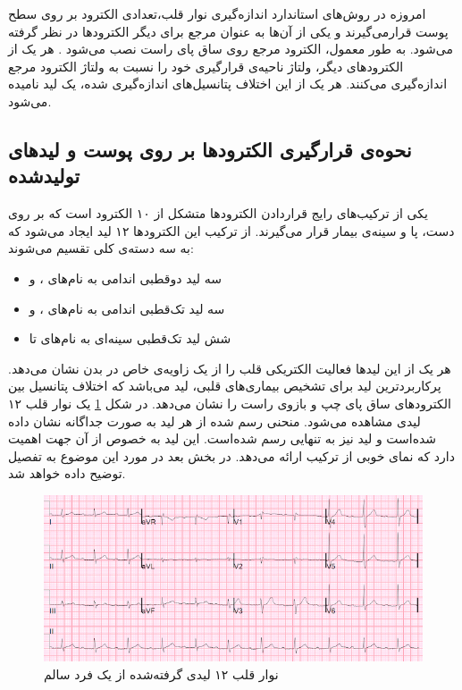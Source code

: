 امروزه در روش‌های استاندارد اندازه‌گیری نوار قلب،تعدادی الکترود بر روی سطح پوست قرارمی‌گیرند و یکی از آن‌ها به عنوان مرجع برای دیگر الکترودها در نظر گرفته می‌شود. به طور معمول، الکترود مرجع روی ساق پای راست نصب می‌شود \cite{ECGSurvey}. هر یک از الکترودهای دیگر، ولتاژ ناحیه‌ی قرارگیری خود را نسبت به ولتاژ الکترود مرجع اندازه‌گیری می‌کنند. هر یک از این اختلاف پتانسیل‌های اندازه‌گیری شده، یک لید نامیده می‌شود. 
\subsection{نحوه‌ی قرارگیری الکترودها بر روی پوست و لیدهای تولیدشده}

یکی از ترکیب‌های رایج قراردادن الکترودها متشکل از ۱۰ الکترود است که بر روی دست، پا و سینه‌ی بیمار قرار می‌گیرند. از ترکیب این الکترودها ۱۲ لید ایجاد می‌شود که به سه دسته‌ی کلی تقسیم می‌شوند:
\begin{itemize}
	\item  سه لید دوقطبی اندامی به نام‌های ،  و 
	\item سه لید تک‌قطبی اندامی به نام‌های ،  و 
	\item شش لید تک‌قطبی سینه‌ای به نام‌های  تا 
\end{itemize}
  هر یک از این لیدها فعالیت الکتریکی قلب را از یک زاویه‌ی خاص در بدن نشان می‌دهد. پرکاربردترین لید برای تشخیص بیماری‌های قلبی، لید  می‌باشد که اختلاف پتانسیل بین الکترودهای ساق پای چپ و بازوی راست را نشان می‌دهد. در شکل \ref{fig:leads} یک نوار قلب ۱۲ لیدی مشاهده می‌شود. منحنی رسم شده از هر لید به صورت جداگانه نشان داده شده‌است و لید  نیز به تنهایی رسم شده‌است. این لید به خصوص از آن جهت اهمیت دارد که نمای خوبی از ترکیب 
ارائه می‌دهد. در بخش بعد در مورد این موضوع به تفصیل توضیح داده خواهد شد.
\begin{figure}
\centering
\includegraphics[width=16cm]{Figures/leads.png}
\caption{نوار قلب ۱۲ لیدی گرفته‌شده از یک فرد سالم\cite{Drsmith}}
\label{fig:leads}
\end{figure}

